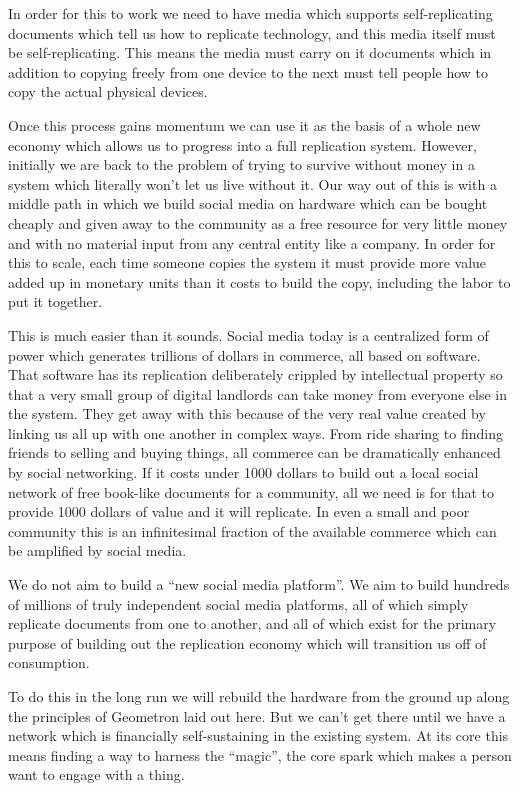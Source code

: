 In order for this to work we need to have media which supports
self-replicating documents which tell us how to replicate technology,
and this media itself must be self-replicating. This means the media
must carry on it documents which in addition to copying freely from one
device to the next must tell people how to copy the actual physical
devices.

Once this process gains momentum we can use it as the basis of a whole
new economy which allows us to progress into a full replication system.
However, initially we are back to the problem of trying to survive
without money in a system which literally won't let us live without it.
Our way out of this is with a middle path in which we build social media
on hardware which can be bought cheaply and given away to the community
as a free resource for very little money and with no material input from
any central entity like a company. In order for this to scale, each time
someone copies the system it must provide more value added up in
monetary units than it costs to build the copy, including the labor to
put it together.

This is much easier than it sounds. Social media today is a centralized
form of power which generates trillions of dollars in commerce, all
based on software. That software has its replication deliberately
crippled by intellectual property so that a very small group of digital
landlords can take money from everyone else in the system. They get away
with this because of the very real value created by linking us all up
with one another in complex ways. From ride sharing to finding friends
to selling and buying things, all commerce can be dramatically enhanced
by social networking. If it costs under 1000 dollars to build out a
local social network of free book-like documents for a community, all we
need is for that to provide 1000 dollars of value and it will replicate.
In even a small and poor community this is an infinitesimal fraction of
the available commerce which can be amplified by social media.

We do not aim to build a ``new social media platform''. We aim to build
hundreds of millions of truly independent social media platforms, all of
which simply replicate documents from one to another, and all of which
exist for the primary purpose of building out the replication economy
which will transition us off of consumption.

To do this in the long run we will rebuild the hardware from the ground
up along the principles of Geometron laid out here. But we can't get
there until we have a network which is financially self-sustaining in
the existing system. At its core this means finding a way to harness the
``magic'', the core spark which makes a person want to engage with a
thing.

